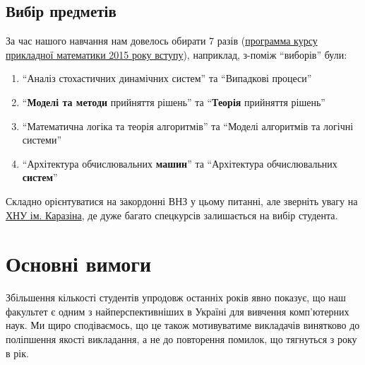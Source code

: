 \documentclass[14pt, a4paper]{extarticle}  %
\begin{document}
\subsection{Вибір предметів}
\label{real_choice}
За час нашого навчання нам довелось обирати 7 разів (\href{http://csc.knu.ua/media/filer_public/3b/e7/3be7da3c-5fc4-454e-b316-c55718de0d42/b6_040301_pm_2015.pdf}{программа курсу прикладної математики 2015 року вступу}), наприклад, з-поміж ``виборів'' були: %
\begin{enumerate}
    \item ``Аналіз стохастичних динамічних систем'' та ``Випадкові процеси''
    \item ``\textbf{Моделі та методи} прийняття рішень'' та ``\textbf{Теорія} прийняття рішень''
    \item  ``Математична логіка та теорія алгоритмів'' та ``Моделі алгоритмів та логічні системи''
    \item ``Архітектура обчислювальних \textbf{машин}'' та ``Архітектура обчислювальних \textbf{систем}''
\end{enumerate}

Складно орієнтуватися на закордонні ВНЗ у цьому питанні, але зверніть увагу на \href{http://appmath.univer.kharkov.ua/courses_new.html}{ХНУ ім. Каразіна}, де дуже багато спецкурсів залишається на вибір студента. 
\newpage

\section{Основні вимоги}
Збільшення кількості студентів упродовж останніх років явно показує, що наш факультет є одним з найперспективніших в Україні для вивчення комп'ютерних наук. Ми щиро сподіваємось, що це також мотивуватиме викладачів винятково до поліпшення якості викладання, а не до повторення помилок, що тягнуться з року в рік. 
\end{document}
